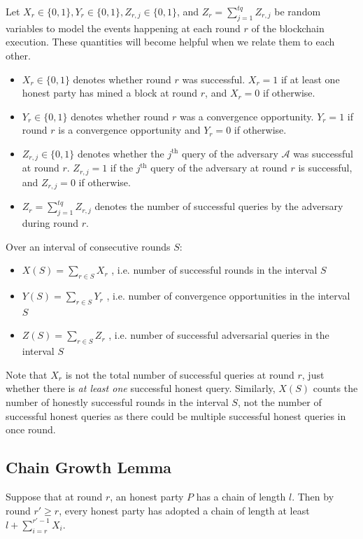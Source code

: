Let $X_r \in \{0,1\}, Y_r \in \{0,1\}, Z_{r,j} \in \{0,1\}$, and $Z_r = \sum_{j=1}^{tq} Z_{r,j}$ be random variables to model the events happening at each round $r$ of the blockchain execution. These quantities will become helpful when we relate them to each other.
\begin{itemize}
    \item $X_r \in \{0, 1\}$ denotes whether round $r$ was successful. $X_r = 1$ if at least one honest party has mined a block at round $r$, and $X_r = 0$ if otherwise.
    \item $Y_r \in \{0, 1\}$ denotes whether round $r$ was a convergence opportunity. $Y_r = 1$ if round $r$ is a convergence opportunity and $Y_r = 0$ if otherwise.
    \item $Z_{r,j} \in \{0,1\}$ denotes whether the $j^\text{th}$ query of the adversary $\mathcal{A}$ was successful at round $r$. $Z_{r,j} = 1$ if the $j^\text{th}$ query of the adversary at round $r$ is successful, and $Z_{r,j} = 0$ if otherwise.
    \item $Z_r = \sum^{tq}_{j = 1} Z_{r,j}$ denotes the number of successful queries by the adversary during round $r$.
\end{itemize}

Over an interval of consecutive rounds $S$:
\begin{itemize}
\item $X(S) = \sum_{r\in S} X_r$ , i.e. number of successful rounds in the interval $S$
\item $Y(S) = \sum_{r\in S} Y_r$ , i.e. number of convergence opportunities in the interval $S$
\item $Z(S) = \sum_{r\in S} Z_r$ , i.e. number of successful adversarial queries in the interval $S$
\end{itemize}

Note that $X_r$ is not the total number of successful queries at round $r$, just whether there is \emph{at least one} successful honest query.
Similarly, $X(S)$ counts the number of honestly successful rounds in the interval $S$, not the number of successful honest queries as there could be multiple successful honest queries in once round.

\subsection{Chain Growth Lemma}

\begin {lemma}
    Suppose that at round $r$, an honest party $P$ has a chain of length $l$. Then by round $r' \geq r$, every honest party has adopted a chain of length at least $l + \sum_{i=r}^{r'-1} X_i$.
\end {lemma}

